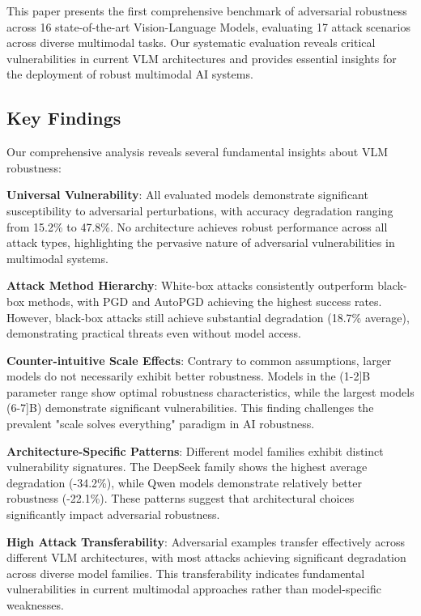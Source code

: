 \label{sec:conclusion}

This paper presents the first comprehensive benchmark of adversarial robustness across 16 state-of-the-art Vision-Language Models, evaluating 17 attack scenarios across diverse multimodal tasks. Our systematic evaluation reveals critical vulnerabilities in current VLM architectures and provides essential insights for the deployment of robust multimodal AI systems.

\subsection{Key Findings}

Our comprehensive analysis reveals several fundamental insights about VLM robustness:

\textbf{Universal Vulnerability}: All evaluated models demonstrate significant susceptibility to adversarial perturbations, with accuracy degradation ranging from 15.2\% to 47.8\%. No architecture achieves robust performance across all attack types, highlighting the pervasive nature of adversarial vulnerabilities in multimodal systems.

\textbf{Attack Method Hierarchy}: White-box attacks consistently outperform black-box methods, with PGD and AutoPGD achieving the highest success rates. However, black-box attacks still achieve substantial degradation (18.7\% average), demonstrating practical threats even without model access.

\textbf{Counter-intuitive Scale Effects}: Contrary to common assumptions, larger models do not necessarily exhibit better robustness. Models in the (1-2]B parameter range show optimal robustness characteristics, while the largest models (6-7]B) demonstrate significant vulnerabilities. This finding challenges the prevalent "scale solves everything" paradigm in AI robustness.

\textbf{Architecture-Specific Patterns}: Different model families exhibit distinct vulnerability signatures. The DeepSeek family shows the highest average degradation (-34.2\%), while Qwen models demonstrate relatively better robustness (-22.1\%). These patterns suggest that architectural choices significantly impact adversarial robustness.

\textbf{High Attack Transferability}: Adversarial examples transfer effectively across different VLM architectures, with most attacks achieving significant degradation across diverse model families. This transferability indicates fundamental vulnerabilities in current multimodal approaches rather than model-specific weaknesses.

